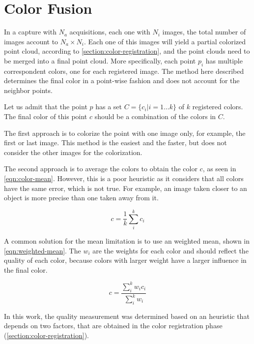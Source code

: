 \section{Color Fusion}
\label{section:color-fusion}

In a capture with $N_a$ acquisitions, each one with $N_i$ images, the total number of images account to $N_a \times N_i$. Each one of this images will yield a partial colorized point cloud, according to \cref{section:color-registration}, and the point clouds need to be merged into a final point cloud. More specifically, each point $p_i$ has multiple correspondent colors, one for each registered image. The method here described determines the final color in a point-wise fashion and does not account for the neighbor points.

Let us admit that the point $p$ has a set $C = \{c_i|i=1\dots k\}$ of $k$ registered colors. The final color of this point $c$ should be a combination of the colors in $C$. 

The first approach is to colorize the point with one image only, for example, the first or last image. This method is the easiest and the faster, but does not consider the other images for the colorization. 

The second approach is to average the colors to obtain the color $c$, as seen in \cref{eqn:color-mean}. However, this is a poor heuristic as it considers that all colors have the same error, which is not true. For example, an image taken closer to an object is more precise than one taken away from it. 

\begin{equation}
    \label{eqn:color-mean}
    c = \frac{1}{k} \sum_{i}^{k}{c_i}
\end{equation}

A common solution for the mean limitation is to use an weighted mean, shown in \cref{eqn:weighted-mean}. The $w_i$ are the weights for each color and should reflect the quality of each color, because colors with larger weight have a larger influence in the final color.

\begin{equation}
    \label{eqn:weighted-mean}
    c = \frac{\sum_{i}^{k}{w_i c_i}}{\sum_{i}^{k}{w_i}}
\end{equation}

In this work, the quality measurement was determined based on an heuristic that depends on two factors, that are obtained in the color registration phase (\cref{section:color-registration}).

